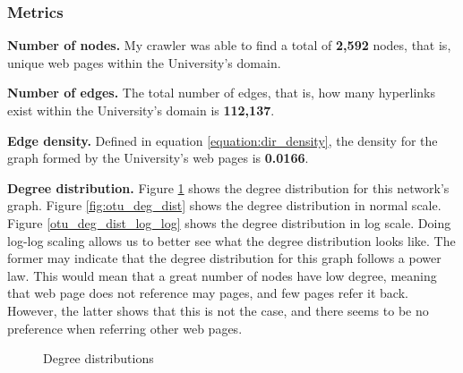 \subsubsection{Metrics}
\textbf{Number of nodes.} My crawler was able to find a total of \textbf{2,592} nodes, that is, unique web pages within the University's domain.

\textbf{Number of edges.} The total number of edges, that is, how many hyperlinks exist within the University's domain is \textbf{112,137}.

\textbf{Edge density.} Defined in equation \ref{equation:dir_density}, the density for the graph formed by the University's web pages is \textbf{0.0166}.

\textbf{Degree distribution.} Figure \ref{fig:6} shows the degree distribution for this network's graph. Figure \ref{fig:otu_deg_dist} shows the degree distribution in normal scale. Figure \ref{otu_deg_dist_log_log} shows the degree distribution in log scale. Doing log-log scaling allows us to better see what the degree distribution looks like. The former may indicate that the degree distribution for this graph follows a power law. This would mean that a great number of nodes have low degree, meaning that web page does not reference may pages, and few pages refer it back. However, the latter shows that this is not the case, and there seems to be no preference when referring other web pages.

\begin{figure}
    \centering
    \qquad
    \caption{Degree distributions}
    \label{fig:6}
\end{figure}

